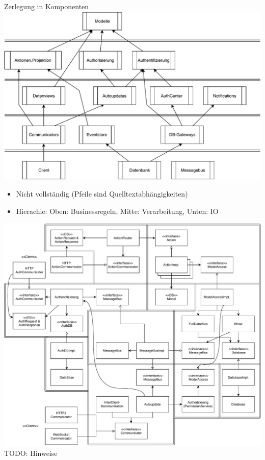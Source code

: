 \documentclass[10pt]{beamer}
\begin{document}
\begin{frame}{Zerlegung in Komponenten}
	\includegraphics[scale=0.5]{hierachie}
	
	\begin{itemize}
		\item Nicht vollständig (Pfeile sind Quelltextabhängigkeiten)
		\item Hierachie: Oben: Businessregeln, Mitte: Verarbeitung, Unten: IO
	\end{itemize}
\end{frame}
\begin{frame}
	\includegraphics[scale=0.45]{komponenten}
	TODO: Hinweise
\end{frame}
\end{document}
